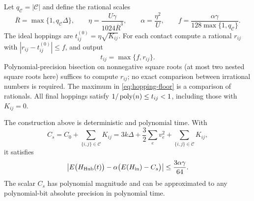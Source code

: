 Let $q_{\mathcal C}=|\mathcal C|$ and define the rational scales
\begin{equation}\label{eq:hubbard-scales}
 \overline R=\max\{1,q_{\mathcal C}\Delta\},\qquad
 \eta=\frac{U\gamma}{1024\overline R^3},\qquad
 \alpha=\frac{\eta^2}{U},\qquad
 f=\frac{\alpha\gamma}{128\max\{1,q_{\mathcal C}\}}.
\end{equation}
The ideal hoppings are $t^{(0)}_{ij}=\eta\sqrt{K_{ij}}$.
For each contact compute a rational $r_{ij}$ with
$|r_{ij}-t^{(0)}_{ij}|\leq f$, and output
\begin{equation}\label{eq:hopping-floor}
 t_{ij}=\max\{f,r_{ij}\}.
\end{equation}
Polynomial-precision bisection on nonnegative square roots (at most
two nested square roots here) suffices to compute $r_{ij}$; no exact
comparison between irrational numbers is required.  The maximum in
\eqref{eq:hopping-floor} is a comparison of rationals.  All final
hoppings satisfy $1/\operatorname{poly}(n)\leq t_{ij}<1$, including those with
$K_{ij}=0$.

\begin{proposition}
\label{prop:hubbard}
The construction above is deterministic and polynomial time.  With
\begin{equation}\label{eq:finite-scalar-shift}
 C_s=C_0+\sum_{\{i,j\}\in\mathcal C}K_{ij}
     =3k\Delta+\frac32\sum_e v_e^2
                        +\sum_{\{i,j\}\in\mathcal C}K_{ij},
\end{equation}
it satisfies
\begin{equation}\label{eq:finite-combined-error}
 \left|E\bigl(H_{\rm Hub}(t)\bigr)
            -\alpha\bigl(E(H_{\rm in})-C_s\bigr)\right|
        \leq\frac{3\alpha\gamma}{64}.
\end{equation}
The scalar $C_s$ has polynomial magnitude and can be approximated to
any polynomial-bit absolute precision in polynomial time.
\end{proposition}

